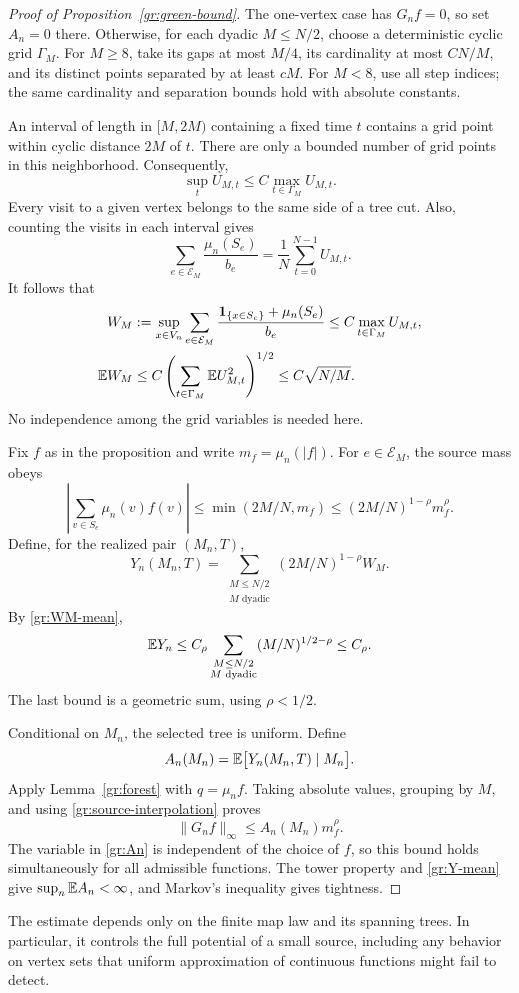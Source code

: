 \begin{proof}[Proof of Proposition~\ref{gr:green-bound}]
The one-vertex case has $G_nf=0$, so set $A_n=0$ there.  Otherwise,
for each dyadic $M\leq N/2$, choose a deterministic cyclic grid
$\Gamma_M$.  For $M\geq8$, take its gaps at most $M/4$, its
cardinality at most $CN/M$, and its distinct points separated by
at least $cM$.  For $M<8$, use all step indices; the same
cardinality and separation bounds hold with absolute constants.

An interval of length in $[M,2M)$ containing a fixed time $t$
contains a grid point within cyclic distance $2M$ of $t$.  There
are only a bounded number of grid points in this neighborhood.
Consequently,
\begin{equation}\label{gr:grid-comparison}
 \sup_t U_{M,t}\leq C\max_{t\in\Gamma_M}U_{M,t}.
\end{equation}
Every visit to a given vertex belongs to the same side of a tree
cut.  Also, counting the visits in each interval gives
\[
 \sum_{e\in\mathcal E_M}\frac{\mu_n(S_e)}{b_e}
       =\frac1N\sum_{t=0}^{N-1}U_{M,t}.
\]
It follows that
\begin{align}
 W_M&:=\sup_{x\in V_n}\sum_{e\in\mathcal E_M}
        \frac{\mathbf 1_{\{x\in S_e\}}+\mu_n(S_e)}{b_e}
       \leq C\max_{t\in\Gamma_M}U_{M,t},
          \label{gr:WM}\\
 \mathbb E W_M&\leq C\left(\sum_{t\in\Gamma_M}
                                    \mathbb E U_{M,t}^2\right)^{1/2}
       \leq C\sqrt{N/M}.\label{gr:WM-mean}
\end{align}
No independence among the grid variables is needed here.

Fix $f$ as in the proposition and write $m_f=\mu_n(|f|)$.
For $e\in\mathcal E_M$, the source mass obeys
\begin{equation}\label{gr:source-interpolation}
 \left|\sum_{v\in S_e}\mu_n(v)f(v)\right|
 \leq\min(2M/N,m_f)
 \leq(2M/N)^{1-\rho}m_f^\rho.
\end{equation}
Define, for the realized pair $(M_n,T)$,
\[
 Y_n(M_n,T)=\sum_{\substack{M\leq N/2\\M\text{ dyadic}}}
                   (2M/N)^{1-\rho}W_M.
\]
By \eqref{gr:WM-mean},
\begin{equation}\label{gr:Y-mean}
 \mathbb E Y_n\leq C_\rho
       \sum_{\substack{M\leq N/2\\M\text{ dyadic}}}
                        (M/N)^{1/2-\rho}
       \leq C_\rho.
\end{equation}
The last bound is a geometric sum, using $\rho<1/2$.

Conditional on $M_n$, the selected tree is uniform.  Define
\begin{equation}\label{gr:An}
 A_n(M_n)=\mathbb E\bigl[Y_n(M_n,T)\mid M_n\bigr].
\end{equation}
Apply Lemma~\ref{gr:forest} with $q=\mu_nf$.  Taking absolute
values, grouping by $M$, and using
\eqref{gr:source-interpolation} proves
\[
 \|G_nf\|_\infty\leq A_n(M_n)m_f^\rho.
\]
The variable in \eqref{gr:An} is independent of the choice of $f$,
so this bound holds simultaneously for all admissible functions.
The tower property and \eqref{gr:Y-mean} give
$\sup_n\mathbb E A_n<\infty$, and Markov's inequality gives tightness.
\end{proof}

The estimate depends only on the finite map law and its spanning
trees.  In particular, it controls the full potential of a small
source, including any behavior on vertex sets that uniform
approximation of continuous functions might fail to detect.
